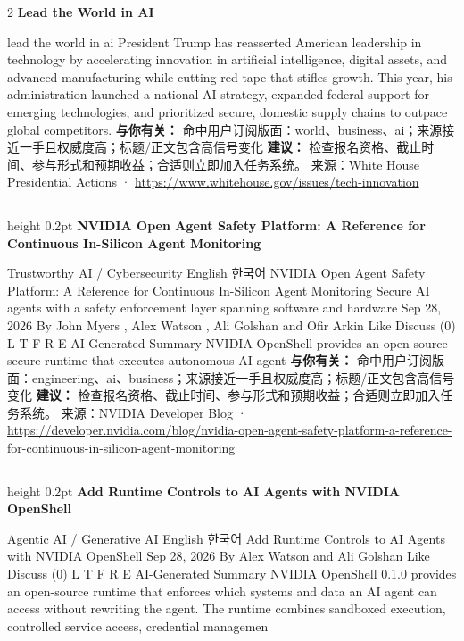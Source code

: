 \documentclass[10.5pt]{ctexart}
\begin{document}
\begin{multicols}{2}
{\large\bfseries Lead the World in AI}\par
lead the world in ai President Trump has reasserted American leadership in technology by accelerating innovation in artificial intelligence, digital assets, and advanced manufacturing while cutting red tape that stifles growth. This year, his administration launched a national AI strategy, expanded federal support for emerging technologies, and prioritized secure, domestic supply chains to outpace global competitors.
\textbf{与你有关：} 命中用户订阅版面：world、business、ai；来源接近一手且权威度高；标题/正文包含高信号变化
\textbf{建议：} 检查报名资格、截止时间、参与形式和预期收益；合适则立即加入任务系统。
{\footnotesize\color{ormuted} 来源：White House Presidential Actions · \url{https://www.whitehouse.gov/issues/tech-innovation}}
\vspace{2mm}
\hrule height 0.2pt
\vspace{2mm}
{\large\bfseries NVIDIA Open Agent Safety Platform: A Reference for Continuous In-Silicon Agent Monitoring}\par
Trustworthy AI / Cybersecurity English 한국어 NVIDIA Open Agent Safety Platform: A Reference for Continuous In-Silicon Agent Monitoring Secure AI agents with a safety enforcement layer spanning software and hardware Sep 28, 2026 By John Myers , Alex Watson , Ali Golshan and Ofir Arkin Like Discuss (0) L T F R E AI-Generated Summary NVIDIA OpenShell provides an open-source secure runtime that executes autonomous AI agent
\textbf{与你有关：} 命中用户订阅版面：engineering、ai、business；来源接近一手且权威度高；标题/正文包含高信号变化
\textbf{建议：} 检查报名资格、截止时间、参与形式和预期收益；合适则立即加入任务系统。
{\footnotesize\color{ormuted} 来源：NVIDIA Developer Blog · \url{https://developer.nvidia.com/blog/nvidia-open-agent-safety-platform-a-reference-for-continuous-in-silicon-agent-monitoring}}
\vspace{2mm}
\hrule height 0.2pt
\vspace{2mm}
{\large\bfseries Add Runtime Controls to AI Agents with NVIDIA OpenShell}\par
Agentic AI / Generative AI English 한국어 Add Runtime Controls to AI Agents with NVIDIA OpenShell Sep 28, 2026 By Alex Watson and Ali Golshan Like Discuss (0) L T F R E AI-Generated Summary NVIDIA OpenShell 0.1.0 provides an open-source runtime that enforces which systems and data an AI agent can access without rewriting the agent. The runtime combines sandboxed execution, controlled service access, credential managemen

\end{multicols}
\end{document}
